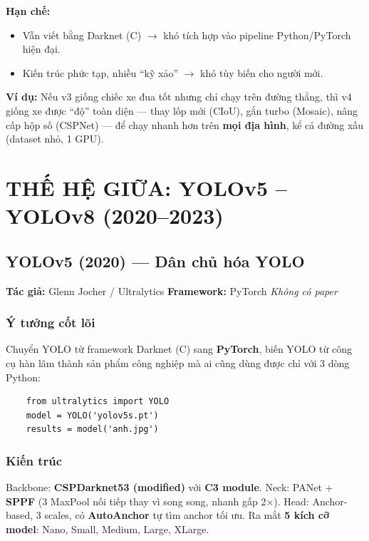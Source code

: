 \documentclass[12pt,a4paper]{report}
\begin{document}
\textbf{Hạn chế:}
\begin{itemize}
    \item Vẫn viết bằng Darknet (C) $\rightarrow$ khó tích hợp vào pipeline Python/PyTorch hiện đại.
    \item Kiến trúc phức tạp, nhiều ``kỹ xảo'' $\rightarrow$ khó tùy biến cho người mới.
\end{itemize}

\textbf{Ví dụ:} Nếu v3 giống chiếc xe đua tốt nhưng chỉ chạy trên đường thẳng, thì v4 giống xe được ``độ'' toàn diện --- thay lốp mới (CIoU), gắn turbo (Mosaic), nâng cấp hộp số (CSPNet) --- để chạy nhanh hơn trên \textbf{mọi địa hình}, kể cả đường xấu (dataset nhỏ, 1 GPU).



\chapter{THẾ HỆ GIỮA: YOLOv5 -- YOLOv8 (2020--2023)}

\section{YOLOv5 (2020) --- Dân chủ hóa YOLO}
\textbf{Tác giả:} Glenn Jocher / Ultralytics \hfill \textbf{Framework:} PyTorch \hfill \textit{Không có paper}

\subsection{Ý tưởng cốt lõi}
Chuyển YOLO từ framework Darknet (C) sang \textbf{PyTorch}, biến YOLO từ công cụ hàn lâm thành sản phẩm công nghiệp mà ai cũng dùng được chỉ với 3 dòng Python:
\begin{verbatim}
    from ultralytics import YOLO
    model = YOLO('yolov5s.pt')
    results = model('anh.jpg')
\end{verbatim}

\subsection{Kiến trúc}
Backbone: \textbf{CSPDarknet53 (modified)} với \textbf{C3 module}. Neck: PANet + \textbf{SPPF} (3 MaxPool nối tiếp thay vì song song, nhanh gấp 2$\times$). Head: Anchor-based, 3 scales, có \textbf{AutoAnchor} tự tìm anchor tối ưu. Ra mắt \textbf{5 kích cỡ model}: Nano, Small, Medium, Large, XLarge.
\end{document}
